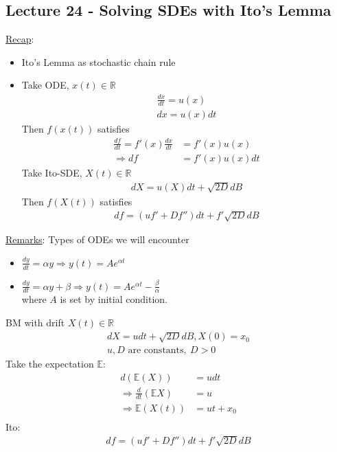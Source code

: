 \documentclass[12pt, letterpaper]{article}
\begin{document}
\subsection{Lecture 24 - Solving SDEs with Ito's Lemma}
\underline{Recap}:
\begin{itemize}
    \item Ito's Lemma as stochastic chain rule
    \item Take ODE, $x(t) \in \mathbb{R}$
    \begin{align*}
        \frac{dx}{dt} = u(x) \\
        dx = u(x)dt
    \end{align*}
    Then $f(x(t))$ satisfies
    \begin{align*}
        \frac{df}{dt} = f'(x)\frac{dx}{dt} &= f'(x)u(x)\\
        \Rightarrow df &= f'(x)u(x)dt
    \end{align*}
    Take Ito-SDE, $X(t) \in \mathbb{R}$
    \begin{align*}
        dX = u(X)dt + \sqrt{2D}dB 
    \end{align*}
    Then $f(X(t))$ satisfies 
    \begin{align*}
        df = (uf' + Df'')dt + f'\sqrt{2D}dB
    \end{align*}
\end{itemize}
\underline{Remarks}: Types of ODEs we will encounter
\begin{itemize}
    \item $\frac{dy}{dt} = \alpha y \Rightarrow y(t) = Ae^{\alpha t}$
    \item $\frac{dy}{dt} = \alpha y + \beta \Rightarrow y(t) = Ae^{\alpha t} - \frac{\beta}{\alpha}$ \\
    where $A$ is set by initial condition.
\end{itemize}
 BM with drift $X(t) \in \mathbb{R}$
\begin{align*}
    dX = udt + \sqrt{2D}dB, X(0)=x_0 \\
    u,D \text{ are constants},\ D > 0
\end{align*}
Take the expectation $\mathbb{E}$:
\begin{align*}
    d(\mathbb{E}(X)) &= udt \\
    \Rightarrow \frac{d}{dt}(\mathbb{E}X) &= u  \\
    \Rightarrow \mathbb{E}(X(t)) &= ut + x_0\\
\end{align*}
Ito:
\begin{align*}
    df = (uf' + Df'')dt + f'\sqrt{2D}dB
\end{align*}
\end{document}
